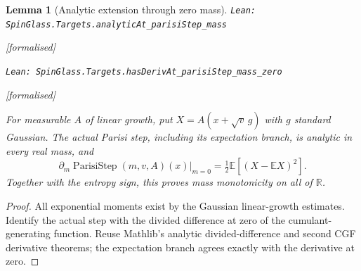 \documentclass[11pt]{article}
\providecommand{\lean}[1]{\leavevmode\par\nopagebreak
  {\noindent\normalfont\footnotesize\raggedright\texttt{Lean: #1}\par}\nopagebreak}
\providecommand{\leanok}{\par\nopagebreak
  {\noindent\normalfont\footnotesize\textcolor{green!50!black}{[formalised]}\par}\nopagebreak}
\newtheorem{lemma}[theorem]{Lemma}
\begin{document}
\begin{lemma}[Analytic extension through zero mass]
\lean{SpinGlass.Targets.analyticAt\_parisiStep\_mass}\leanok
\lean{SpinGlass.Targets.hasDerivAt\_parisiStep\_mass\_zero}\leanok
For measurable $A$ of linear growth, put $X=A(x+\sqrt v\,g)$ with $g$ standard
Gaussian. The actual Parisi step, including its expectation branch, is analytic
in every real mass, and
\[
 \left.\partial_m\operatorname{ParisiStep}(m,v,A)(x)\right|_{m=0}
   =\tfrac12\mathbb E[(X-\mathbb E X)^2].
\]
Together with the entropy sign, this proves mass monotonicity on all of $\mathbb R$.
\end{lemma}
\begin{proof}
All exponential moments exist by the Gaussian linear-growth estimates. Identify
the actual step with the divided difference at zero of the cumulant-generating
function. Reuse Mathlib's analytic divided-difference and second CGF derivative
theorems; the expectation branch agrees exactly with the derivative at zero.
\end{proof}
\end{document}

